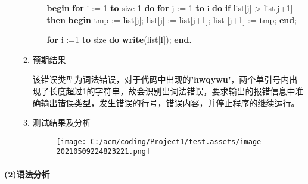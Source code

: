 \documentclass[]{ctexart}
\newenvironment{Shaded}{}{}
\newcommand{\DecValTok}[1]{\textcolor[rgb]{0.25,0.63,0.44}{#1}}
\newcommand{\KeywordTok}[1]{\textcolor[rgb]{0.00,0.44,0.13}{\textbf{#1}}}
\newcommand{\NormalTok}[1]{#1}
\let\oldparagraph\paragraph
\renewcommand{\paragraph}[1]{\oldparagraph{#1}\mbox{}}
\begin{document}
\begin{enumerate}
\begin{enumerate}
\begin{enumerate}
\begin{Shaded}
\begin{Highlighting}[]
\KeywordTok{begin}
    \KeywordTok{for}\NormalTok{ i := }\DecValTok{1} \KeywordTok{to}\NormalTok{ size}\DecValTok{-1} \KeywordTok{do}
	\KeywordTok{for}\NormalTok{ j := }\DecValTok{1} \KeywordTok{to}\NormalTok{ i }\KeywordTok{do}
	    \KeywordTok{if}\NormalTok{ list[j] > list[j+}\DecValTok{1}\NormalTok{] }\KeywordTok{then}
	    \KeywordTok{begin}
\NormalTok{		    tmp := list[j];}
\NormalTok{		    list[j] := list[j+}\DecValTok{1}\NormalTok{];}
\NormalTok{		    list [j+}\DecValTok{1}\NormalTok{] := tmp;}
	    \KeywordTok{end}\NormalTok{;}

    \KeywordTok{for}\NormalTok{ i :=}\DecValTok{1} \KeywordTok{to}\NormalTok{ size }\KeywordTok{do}
	\KeywordTok{write}\NormalTok{(list[I]);}
\KeywordTok{end}\NormalTok{.}
\end{Highlighting}
\end{Shaded}
    \end{enumerate}
  \item
    预期结果

    该错误类型为词法错误，对于代码中出现的\textbf{'hwqywu'}，两个单引号内出现了长度超过1的字符串，故会识别出词法错误，要求输出的报错信息中准确输出错误类型，发生错误的行号，错误内容，并停止程序的继续运行。
  \item
    测试结果及分析

    \begin{figure}
    \centering
    \texttt{[image: C:/acm/coding/Project1/test.assets/image-20210509224823221.png]}
    \caption{}
    \end{figure}
  \end{enumerate}
\end{enumerate}

\hypertarget{header-n286}{%
\paragraph{(2)语法分析}\label{header-n286}}
\end{document}
